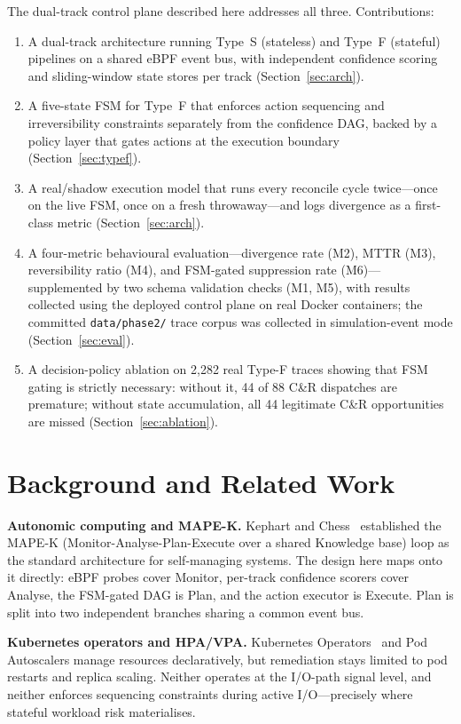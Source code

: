 \documentclass[conference]{IEEEtran}
\begin{document}
The dual-track control plane described here addresses all three. Contributions:
\begin{enumerate}
\item A dual-track architecture running Type~S (stateless) and Type~F (stateful) pipelines on a shared eBPF event bus, with independent confidence scoring and sliding-window state stores per track (Section~\ref{sec:arch}).
\item A five-state FSM for Type~F that enforces action sequencing and irreversibility constraints separately from the confidence DAG, backed by a policy layer that gates actions at the execution boundary (Section~\ref{sec:typef}).
\item A real/shadow execution model that runs every reconcile cycle twice---once on the live FSM, once on a fresh throwaway---and logs divergence as a first-class metric (Section~\ref{sec:arch}).
\item A four-metric behavioural evaluation---divergence rate (M2), MTTR (M3), reversibility ratio (M4), and FSM-gated suppression rate (M6)---supplemented by two schema validation checks (M1, M5), with results collected using the deployed control plane on real Docker containers; the committed \texttt{data/phase2/} trace corpus was collected in simulation-event mode (Section~\ref{sec:eval}).
\item A decision-policy ablation on 2,282 real Type-F traces showing that FSM gating is strictly necessary: without it, 44 of 88 C\&R dispatches are premature; without state accumulation, all 44 legitimate C\&R opportunities are missed (Section~\ref{sec:ablation}).
\end{enumerate}

\section{Background and Related Work}
\label{sec:background}

\textbf{Autonomic computing and MAPE-K.} Kephart and Chess~\cite{b8} established the MAPE-K (Monitor-Analyse-Plan-Execute over a shared Knowledge base) loop as the standard architecture for self-managing systems. The design here maps onto it directly: eBPF probes cover Monitor, per-track confidence scorers cover Analyse, the FSM-gated DAG is Plan, and the action executor is Execute. Plan is split into two independent branches sharing a common event bus.

\textbf{Kubernetes operators and HPA/VPA.} Kubernetes Operators~\cite{b1} and Pod Autoscalers manage resources declaratively, but remediation stays limited to pod restarts and replica scaling. Neither operates at the I/O-path signal level, and neither enforces sequencing constraints during active I/O---precisely where stateful workload risk materialises.
\end{document}

